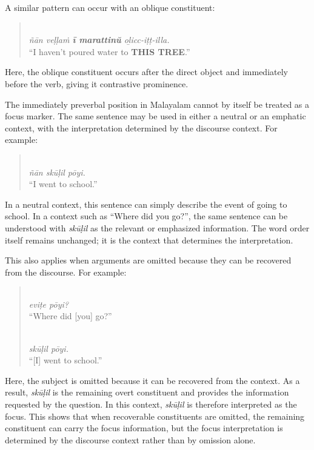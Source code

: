 A similar pattern can occur with an oblique constituent:

\begin{quote}
\\
\textit{ñān veḷḷaṁ \textbf{ī marattinŭ} oḻicc-iṭṭ-illa.}\\
``I haven't poured water to \textbf{THIS TREE}.''
\end{quote}

Here, the oblique constituent occurs after the direct object and immediately before the verb, giving it contrastive prominence.

The immediately preverbal position in Malayalam cannot by itself be treated as a focus marker. The same sentence may be used in either a neutral or an emphatic context, with the interpretation determined by the discourse context. For example:

\begin{quote}
\\
\textit{ñān skūḷil pōyi.}\\
``I went to school.''
\end{quote}

In a neutral context, this sentence can simply describe the event of going to school. In a context such as ``Where did you go?'', the same sentence can be understood with \textit{skūḷil} as the relevant or emphasized information. The word order itself remains unchanged; it is the context that determines the interpretation.


This also applies when arguments are omitted because they can be recovered from the discourse. For example:

\begin{quote}
\\
\textit{eviṭe pōyi?}\\
``Where did [you] go?''

\\
\textit{skūḷil pōyi.}\\
``[I] went to school.''
\end{quote}

Here, the subject is omitted because it can be recovered from the context. As a result, \textit{skūḷil} is the remaining overt constituent and provides the information requested by the question. In this context, \textit{skūḷil} is therefore interpreted as the focus. This shows that when recoverable constituents are omitted, the remaining constituent can carry the focus information, but the focus interpretation is determined by the discourse context rather than by omission alone.

